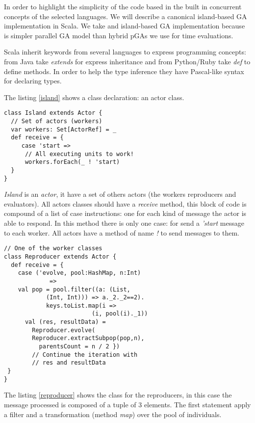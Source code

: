 In order to highlight the simplicity of the code based in the built in concurrent concepts of the selected languages. We will describe a canonical island-based GA implementation in Scala. We take and island-based GA implementation because is simpler parallel GA model than  hybrid pGAs we use for time evaluations.

Scala inherit keywords from several languages to express programming concepts: from Java take {\em extends} for express inheritance and from Python/Ruby take {\em def} to define methods. In order to help the type inference they have Pascal-like syntax for declaring types.

The listing \ref{island} shows a class declaration: an actor class.

\begin{lstlisting}[frame=none]
class Island extends Actor {
  // Set of actors (workers)
  var workers: Set[ActorRef] = _
  def receive = {
     case 'start =>
      // All executing units to work!
      workers.forEach(_ ! 'start)
  }
}
\end{lstlisting}

{\em Island} is an {\em actor}, it have a set of others actors (the workers reproducers and evaluators). All actors classes should have a {\em receive} method, this block of code is compound of a list of case instructions: one for each kind of message the actor is able to respond. In this method there is only one case: for send a {\em 'start} message to each worker. All actors have a method of name {\em !} to send messages to them.

\begin{lstlisting}[frame=none]
// One of the worker classes
class Reproducer extends Actor {
  def receive = {
    case ('evolve, pool:HashMap, n:Int)
             =>
    val pop = pool.filter((a: (List,
            (Int, Int))) => a._2._2==2).
            keys.toList.map(i =>
                         (i, pool(i)._1))
      val (res, resultData) =
        Reproducer.evolve(
        Reproducer.extractSubpop(pop,n),
          parentsCount = n / 2 })
        // Continue the iteration with
        // res and resultData
 }
}
\end{lstlisting}

The listing \ref{reproducer} shows the class for the reproducers, in this case the message processed is composed of a tuple of 3 elements. The first statement apply a filter and a transformation (method {\em map}) over the pool of individuals.

